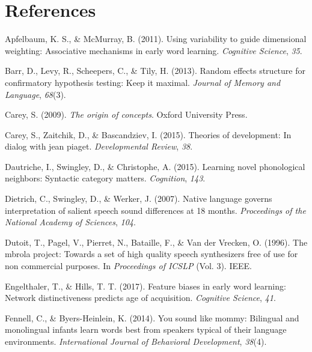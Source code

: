 \documentclass[english,,man]{apa6}
\theoremstyle{definition}
\theoremstyle{definition}
\theoremstyle{definition}
\theoremstyle{remark}
\begin{document}
\section{References}\label{references}

\setlength{\parindent}{-0.5in} \setlength{\leftskip}{0.5in}

\hypertarget{refs}{}
\hypertarget{ref-apfelbaum2011}{}
Apfelbaum, K. S., \& McMurray, B. (2011). Using variability to guide
dimensional weighting: Associative mechanisms in early word learning.
\emph{Cognitive Science}, \emph{35}.

\hypertarget{ref-barr2013}{}
Barr, D., Levy, R., Scheepers, C., \& Tily, H. (2013). Random effects
structure for confirmatory hypothesis testing: Keep it maximal.
\emph{Journal of Memory and Language}, \emph{68}(3).

\hypertarget{ref-carey2009}{}
Carey, S. (2009). \emph{The origin of concepts}. Oxford University
Press.

\hypertarget{ref-carey2015}{}
Carey, S., Zaitchik, D., \& Bascandziev, I. (2015). Theories of
development: In dialog with jean piaget. \emph{Developmental Review},
\emph{38}.

\hypertarget{ref-dautriche2015}{}
Dautriche, I., Swingley, D., \& Christophe, A. (2015). Learning novel
phonological neighbors: Syntactic category matters. \emph{Cognition},
\emph{143}.

\hypertarget{ref-dietrich2007}{}
Dietrich, C., Swingley, D., \& Werker, J. (2007). Native language
governs interpretation of salient speech sound differences at 18 months.
\emph{Proceedings of the National Academy of Sciences}, \emph{104}.

\hypertarget{ref-dutoit1996}{}
Dutoit, T., Pagel, V., Pierret, N., Bataille, F., \& Van der Vrecken, O.
(1996). The mbrola project: Towards a set of high quality speech
synthesizers free of use for non commercial purposes. In
\emph{Proceedings of ICSLP} (Vol. 3). IEEE.

\hypertarget{ref-engelthaler2017}{}
Engelthaler, T., \& Hills, T. T. (2017). Feature biases in early word
learning: Network distinctiveness predicts age of acquisition.
\emph{Cognitive Science}, \emph{41}.

\hypertarget{ref-Fennell2014}{}
Fennell, C., \& Byers-Heinlein, K. (2014). You sound like mommy:
Bilingual and monolingual infants learn words best from speakers typical
of their language environments. \emph{International Journal of
Behavioral Development}, \emph{38}(4).
\end{document}
